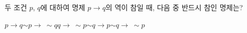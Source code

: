 두 조건 $p$, $q$에 대하여 명제 $p\longrightarrow q$의 역이 참일 때, 다음 중 반드시 참인 명제는?
\begin{choices32}{$p\longrightarrow q$}{$\sim p\longrightarrow\ \sim q$}{$q\longrightarrow\ \sim p$}{$\sim q\longrightarrow p$}{$\sim q\longrightarrow\ \sim p$}\end{choices32}
